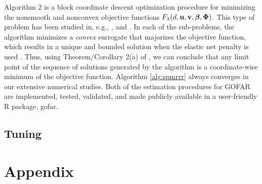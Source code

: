 \documentclass[12pt]{article}
\newcommand{\cb}{\color{blue}}
\begin{document}
{%
Algorithm 2 is a block coordinate descent optimization procedure for minimizing the nonsmooth and nonconvex objective functions $F_{\lambda}(d,{\bf u},{\bf v},\mbox{\boldmath $\beta$},\mbox{\boldmath $\Phi$})$.
This type of problem has been studied in, e.g., \citet{gorski2007}, \citet{razaviyayn2013unified} and \citet{mishra2017sequential}. In each of the sub-problems, the algorithm minimizes a \emph{convex} surrogate that majorizes the objective function, which results in a unique and bounded solution when the elastic net penalty is used  \citep{mishra2017sequential}. Thus, using Theorem/Corollary 2(a) of \citet{razaviyayn2013unified}, we can conclude that any limit point of the sequence of solutions generated by the algorithm is a coordinate-wise minimum of the objective function.}
Algorithm \ref{alg:spmrrr} always converges in our extensive numerical studies. %
Both of the estimation procedures for GOFAR are implemented, tested, validated, and made  publicly available in a user-friendly R package,  \textsf{gofar}. 


\subsection{Tuning}\label{subsec:tuning}

\section{Appendix}\label{sup:sec_optmin}
\end{document}

